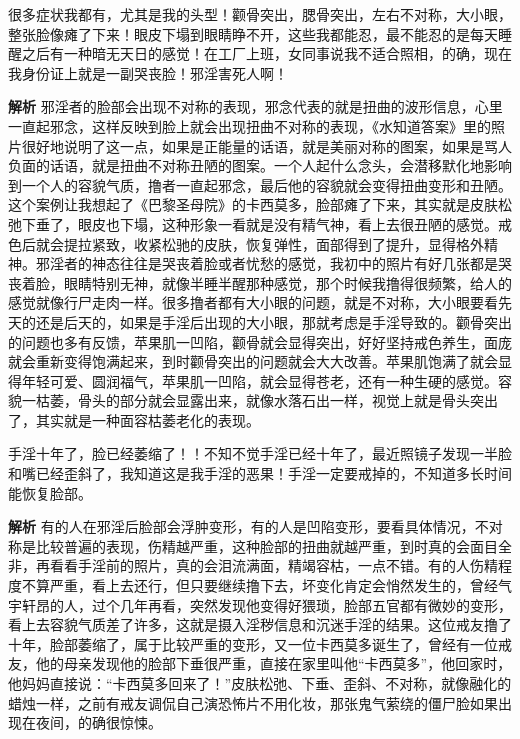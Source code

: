 \begin{case}
    很多症状我都有，尤其是我的头型！颧骨突出，腮骨突出，左右不对称，大小眼，整张脸像瘫了下来！眼皮下塌到眼睛睁不开，这些我都能忍，最不能忍的是每天睡醒之后有一种暗无天日的感觉！在工厂上班，女同事说我不适合照相，的确，现在我身份证上就是一副哭丧脸！邪淫害死人啊！

    \textbf{解析} 邪淫者的脸部会出现不对称的表现，邪念代表的就是扭曲的波形信息，心里一直起邪念，这样反映到脸上就会出现扭曲不对称的表现，《水知道答案》里的照片很好地说明了这一点，如果是正能量的话语，就是美丽对称的图案，如果是骂人负面的话语，就是扭曲不对称丑陋的图案。一个人起什么念头，会潜移默化地影响到一个人的容貌气质，撸者一直起邪念，最后他的容貌就会变得扭曲变形和丑陋。这个案例让我想起了《巴黎圣母院》的卡西莫多，脸部瘫了下来，其实就是皮肤松弛下垂了，眼皮也下塌，这种形象一看就是没有精气神，看上去很丑陋的感觉。戒色后就会提拉紧致，收紧松驰的皮肤，恢复弹性，面部得到了提升，显得格外精神。邪淫者的神态往往是哭丧着脸或者忧愁的感觉，我初中的照片有好几张都是哭丧着脸，眼睛特别无神，就像半睡半醒那种感觉，那个时候我撸得很频繁，给人的感觉就像行尸走肉一样。很多撸者都有大小眼的问题，就是不对称，大小眼要看先天的还是后天的，如果是手淫后出现的大小眼，那就考虑是手淫导致的。颧骨突出的问题也多有反馈，苹果肌一凹陷，颧骨就会显得突出，好好坚持戒色养生，面庞就会重新变得饱满起来，到时颧骨突出的问题就会大大改善。苹果肌饱满了就会显得年轻可爱、圆润福气，苹果肌一凹陷，就会显得苍老，还有一种生硬的感觉。容貌一枯萎，骨头的部分就会显露出来，就像水落石出一样，视觉上就是骨头突出了，其实就是一种面容枯萎老化的表现。
\end{case}

\begin{case}
    手淫十年了，脸已经萎缩了！！不知不觉手淫已经十年了，最近照镜子发现一半脸和嘴已经歪斜了，我知道这是我手淫的恶果！手淫一定要戒掉的，不知道多长时间能恢复脸部。

    \textbf{解析} 有的人在邪淫后脸部会浮肿变形，有的人是凹陷变形，要看具体情况，不对称是比较普遍的表现，伤精越严重，这种脸部的扭曲就越严重，到时真的会面目全非，再看看手淫前的照片，真的会泪流满面，精竭容枯，一点不错。有的人伤精程度不算严重，看上去还行，但只要继续撸下去，坏变化肯定会悄然发生的，曾经气宇轩昂的人，过个几年再看，突然发现他变得好猥琐，脸部五官都有微妙的变形，看上去容貌气质差了许多，这就是摄入淫秽信息和沉迷手淫的结果。这位戒友撸了十年，脸部萎缩了，属于比较严重的变形，又一位卡西莫多诞生了，曾经有一位戒友，他的母亲发现他的脸部下垂很严重，直接在家里叫他“卡西莫多”，他回家时，他妈妈直接说：“卡西莫多回来了！”皮肤松弛、下垂、歪斜、不对称，就像融化的蜡烛一样，之前有戒友调侃自己演恐怖片不用化妆，那张鬼气萦绕的僵尸脸如果出现在夜间，的确很惊悚。
\end{case}

